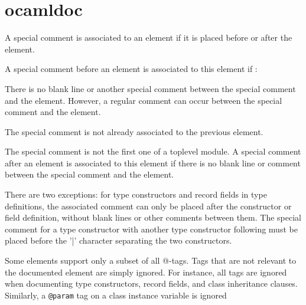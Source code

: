 \section{ocamldoc}

A special comment is associated to an element if it is placed before
or after the element.


A special comment before an element is associated to this element if :


There is no blank line or another special comment between the special
comment and the element. However, a regular comment can occur between
the special comment and the element.


The special comment is not already associated to the previous element.


The special comment is not the first one of a toplevel module.
A special comment after an element is associated to this element if
there is no blank line or comment between the special comment and the
element.

There are two exceptions: for type constructors and record fields in
type definitions, the associated comment can only be placed after the
constructor or field definition, without blank lines or other comments
between them. The special comment for a type constructor with another
type constructor following must be placed before the '|' character
separating the two constructors.



Some elements support only a subset of all @-tags. Tags that are not
relevant to the documented element are simply ignored. For instance,
all tags are ignored when documenting type constructors, record
fields, and class inheritance clauses. Similarly, a \verb|@param| tag on a
class instance variable is ignored


